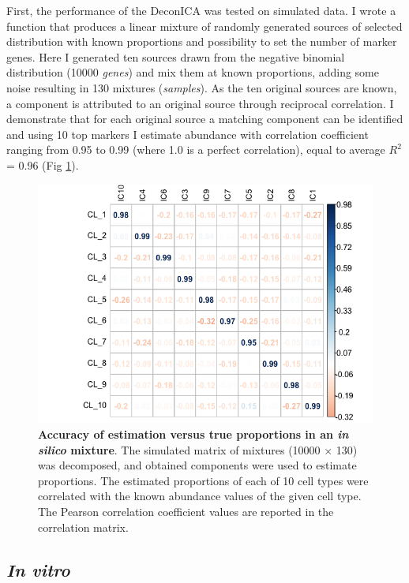 \documentclass[12pt,]{book}
\theoremstyle{definition}
\theoremstyle{definition}
\theoremstyle{definition}
\theoremstyle{remark}
\begin{document}
First, the performance of the DeconICA was tested on simulated data. I
wrote a function that produces a linear mixture of randomly generated
sources of selected distribution with known proportions and possibility
to set the number of marker genes. Here I generated ten sources drawn
from the negative binomial distribution (10000 \emph{genes}) and mix
them at known proportions, adding some noise resulting in 130 mixtures
(\emph{samples}). As the ten original sources are known, a component is
attributed to an original source through reciprocal correlation. I
demonstrate that for each original source a matching component can be
identified and using 10 top markers I estimate abundance with
correlation coefficient ranging from 0.95 to 0.99 (where 1.0 is a
perfect correlation), equal to average \(R^2\)= 0.96 (Fig
\ref{fig:insilico}).

\begin{figure}

{\centering \includegraphics[width=0.7\linewidth]{figures-ext/insilico} 

}

\caption[Accuracy of estimation versus true proporitons in an in silico mixture]{\textbf{Accuracy of estimation versus true
proportions in an \emph{in silico} mixture}. The simulated matrix of
mixtures (10000 \(\times\) 130) was decomposed, and obtained components
were used to estimate proportions. The estimated proportions of each of
10 cell types were correlated with the known abundance values of the
given cell type. The Pearson correlation coefficient values are reported
in the correlation matrix.}\label{fig:insilico}
\end{figure}









\hypertarget{in-vitro}{%
\subsection{\texorpdfstring{\emph{In vitro}}{In vitro}}\label{in-vitro}}
\end{document}
